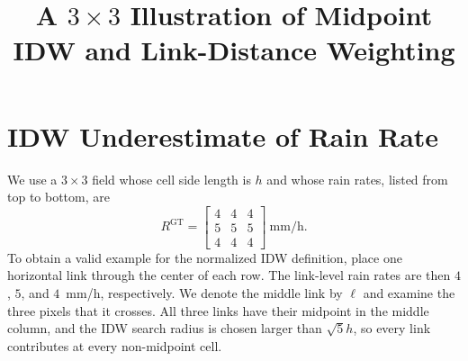 \documentclass[10pt]{article}
\title{A $3\times3$ Illustration of Midpoint IDW and Link-Distance Weighting}
\author{}
\date{}
\begin{document}
\maketitle
\vspace{-2.5em}

\section{IDW Underestimate of Rain Rate}

We use a $3\times3$ field whose cell side length is $h$ and whose rain rates,
listed from top to bottom, are
\begin{equation}
R^{\mathrm{GT}}=
\begin{bmatrix}
4&4&4\\
5&5&5\\
4&4&4
\end{bmatrix}\ \mathrm{mm/h}.
\label{eq:gt-field}
\end{equation}
To obtain a valid example for the normalized IDW definition, place one
horizontal link through the center of each row.  The link-level rain rates are
then $4$, $5$, and $4$~mm/h, respectively.  We denote the middle link by
$\ell$ and examine the three pixels that it crosses.  All three links have
their midpoint in the middle column, and the IDW search radius is chosen larger
than $\sqrt{5}h$, so every link contributes at every non-midpoint cell.
\end{document}
